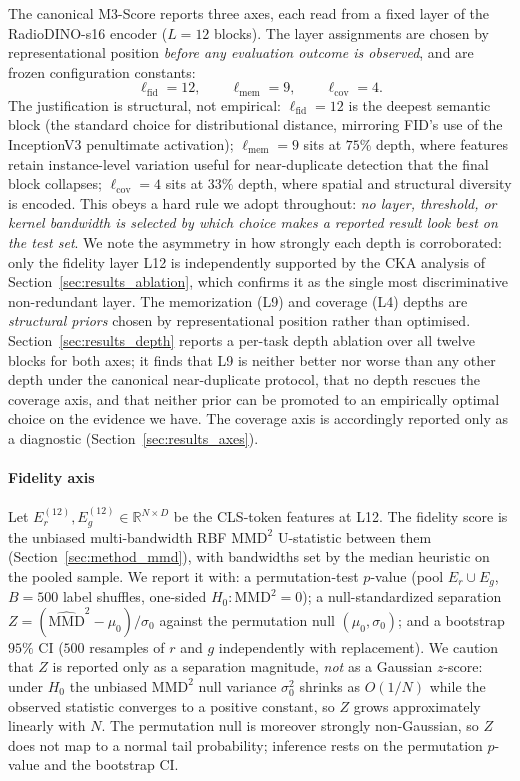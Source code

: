 \documentclass[lettersize,journal]{IEEEtran}
\begin{document}
The canonical M3-Score reports three axes, each read from a fixed layer
of the RadioDINO-s16 encoder ($L = 12$ blocks). The layer assignments are
chosen by representational position \emph{before any evaluation outcome is
observed}, and are frozen configuration constants:
\begin{equation}
\ell_{\text{fid}} = 12, \qquad
\ell_{\text{mem}} = 9, \qquad
\ell_{\text{cov}} = 4 .
\end{equation}
The justification is structural, not empirical: $\ell_{\text{fid}}=12$ is the
deepest semantic block (the standard choice for distributional distance,
mirroring FID's use of the InceptionV3 penultimate activation);
$\ell_{\text{mem}}=9$ sits at $75\%$ depth, where features retain
instance-level variation useful for near-duplicate detection that the final
block collapses; $\ell_{\text{cov}}=4$ sits at $33\%$ depth, where spatial
and structural diversity is encoded. This obeys a hard rule we adopt
throughout: \emph{no layer, threshold, or kernel bandwidth is selected by
which choice makes a reported result look best on the test set}.
We note the asymmetry in how strongly each depth is corroborated: only the
fidelity layer L12 is independently supported by the CKA analysis of
Section~\ref{sec:results_ablation}, which confirms it as the single most
discriminative non-redundant layer. The memorization (L9) and coverage (L4)
depths are \emph{structural priors} chosen by representational position rather
than optimised. Section~\ref{sec:results_depth} reports a per-task depth
ablation over all twelve blocks for both axes; it finds that L9 is neither
better nor worse than any other depth under the canonical near-duplicate
protocol, that no depth rescues the coverage axis, and that neither prior can
be promoted to an empirically optimal choice on the evidence we have. The
coverage axis is accordingly reported only as a diagnostic
(Section~\ref{sec:results_axes}).

\paragraph{Fidelity axis}
Let $E_r^{(12)}, E_g^{(12)} \in \mathbb{R}^{N \times D}$ be the CLS-token
features at L12. The fidelity score is the unbiased multi-bandwidth RBF
$\mathrm{MMD}^2$ U-statistic between them (Section~\ref{sec:method_mmd}),
with bandwidths set by the median heuristic on the pooled sample. We report
it with: a permutation-test $p$-value (pool $E_r\cup E_g$, $B=500$ label
shuffles, one-sided $H_0:\mathrm{MMD}^2=0$); a null-standardized separation
$Z = (\widehat{\mathrm{MMD}}^2 - \mu_0)/\sigma_0$ against the permutation
null $(\mu_0,\sigma_0)$; and a bootstrap $95\%$ CI ($500$ resamples of $r$
and $g$ independently with replacement). We caution that $Z$ is reported only
as a separation magnitude, \emph{not} as a Gaussian $z$-score: under $H_0$ the
unbiased $\mathrm{MMD}^2$ null variance $\sigma_0^2$ shrinks as $O(1/N)$ while
the observed statistic converges to a positive constant, so $Z$ grows
approximately linearly with $N$. The permutation null is moreover strongly
non-Gaussian, so $Z$ does not map to a normal tail probability; inference
rests on the permutation $p$-value and the bootstrap CI.
\end{document}

